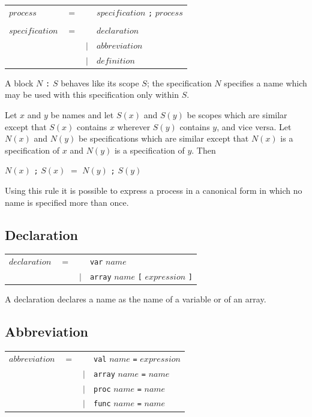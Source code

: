 \documentclass[a4paper, 12pt]{article}
\begin{document}
\begin{tabular}{llll}
$process$    & $=$ &&$specification$ \verb|;| $process$ \\
&&&\\
$specification$ & $=$ && $declaration$\\ 
                               &&$|$& $abbreviation$\\
                               &&$|$& $definition$
 \end{tabular}   

A block $N$ \verb|:| $S$ behaves like its scope $S$; the specification $N$ specifies a name which may be 
used with this specification only within $S$. 

Let $x$ and $y$ be names and let $S(x)$ and $S(y)$ be scopes which are similar except that $S(x)$ contains 
$x$ wherever $S(y)$ contains $y$, and vice versa. Let $N(x)$ and $N(y)$ be specifications which are similar
except that $N(x)$ is a specification of $x$ and $N(y)$ is a specification of $y$. Then 

$N(x)$ \verb|;| $S(x)$ $=$ $N(y)$ \verb|;| $S(y)$ 
                         
Using this rule it is possible to express a process in a canonical form in which no name is specified more than
once. 

\subsection*{Declaration}

\begin{tabular}{llll}
$declaration$    & $=$ &&\verb|var| $name$ \\
                              && $|$  &\verb|array| $name$ \verb|[| $expression$ \verb|]|
\end{tabular}

A declaration declares a name as the name of a variable or of an array. 

\subsection*{Abbreviation}

\begin{tabular}{llll}
$abbreviation$    & $=$ &&\verb|val|  $name$ \verb|=| $expression$ \\
                               &&$|$ & \verb|array| $name$ \verb|=| $name$ \\
                               &&$|$ & \verb|proc| $name$ \verb|=| $name$ \\
                               &&$|$ & \verb|func| $name$ \verb|=| $name$ \\
\end{tabular}   
\end{document}

